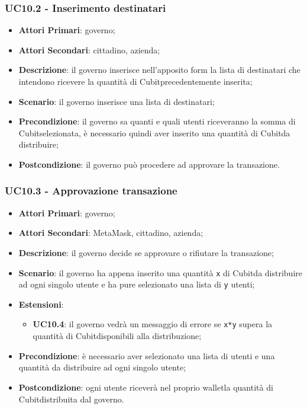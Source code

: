 \subsubsection{UC10.2 - Inserimento destinatari}
\begin{itemize}
	\item \textbf{Attori Primari}: governo;
	\item \textbf{Attori Secondari}: cittadino, azienda;
	\item \textbf{Descrizione}: il governo inserisce nell'apposito form la lista di destinatari che intendono ricevere la quantità di Cubit\glosp precedentemente inserita;
	\item \textbf{Scenario}: il governo inserisce una lista di destinatari;
	\item \textbf{Precondizione}: il governo sa quanti e quali utenti riceveranno la somma di Cubit\glosp selezionata, è necessario quindi aver inserito una quantità di Cubit\glosp da distribuire;
	\item \textbf{Postcondizione}: il governo può procedere ad approvare la transazione.
\end{itemize}
\subsubsection{UC10.3 - Approvazione transazione}
\begin{itemize}
	\item \textbf{Attori Primari}: governo;
	\item \textbf{Attori Secondari}: MetaMask\glo, cittadino, azienda\glo;
	\item \textbf{Descrizione}: il governo decide se approvare o rifiutare la transazione;
	\item \textbf{Scenario}: il governo ha appena inserito una quantità \texttt{x} di Cubit\glosp da distribuire ad ogni singolo utente e ha pure selezionato una lista di \texttt{y} utenti;
	\item \textbf{Estensioni}:
	\begin{itemize}
		\item \textbf{UC10.4}: il governo vedrà un messaggio di errore se \texttt{x*y} supera la quantità di Cubit\glosp disponibili alla distribuzione;
	\end{itemize}
	\item \textbf{Precondizione}: è necessario aver selezionato una lista di utenti e una quantità da distribuire ad ogni singolo utente;
	\item \textbf{Postcondizione}: ogni utente riceverà nel proprio wallet\glosp la quantità di Cubit\glosp distribuita dal governo.
\end{itemize}
